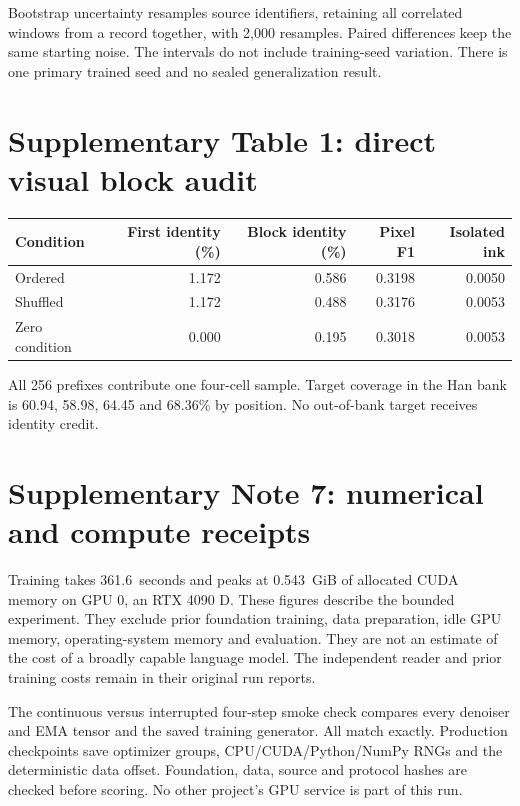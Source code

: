 \documentclass[10pt,a4paper]{article}
\newcommand{\TrainSeconds}{361.6}
\newcommand{\TrainMemory}{0.543}
\begin{document}
Bootstrap uncertainty resamples source identifiers, retaining all correlated
windows from a record together, with 2,000 resamples. Paired differences keep
the same starting noise. The intervals do not include training-seed variation.
There is one primary trained seed and no sealed generalization result.

\section*{Supplementary Table 1: direct visual block audit}
\begin{center}\begin{tabular}{lrrrr}\toprule
Condition & First identity (\%) & Block identity (\%) & Pixel F1 & Isolated ink \\
\midrule
Ordered & 1.172 & 0.586 & 0.3198 & 0.0050 \\
Shuffled & 1.172 & 0.488 & 0.3176 & 0.0053 \\
Zero condition & 0.000 & 0.195 & 0.3018 & 0.0053 \\
\bottomrule\end{tabular}\end{center}
All 256 prefixes contribute one four-cell sample. Target coverage in the Han bank is 60.94, 58.98, 64.45 and 68.36\% by position. No out-of-bank target receives identity credit.


\section*{Supplementary Note 7: numerical and compute receipts}
Training takes \TrainSeconds\ seconds and peaks at \TrainMemory\ GiB of
allocated CUDA memory on GPU 0, an RTX 4090 D. These figures describe the
bounded experiment. They exclude prior foundation training, data preparation,
idle GPU memory, operating-system memory and evaluation. They are not an
estimate of the cost of a broadly capable language model. The independent
reader and prior training costs remain in their original run reports.

The continuous versus interrupted four-step smoke check compares every
denoiser and EMA tensor and the saved training generator. All match exactly.
Production checkpoints save optimizer groups, CPU/CUDA/Python/NumPy RNGs and
the deterministic data offset. Foundation, data, source and protocol hashes
are checked before scoring. No other project's GPU service is part of this run.
\end{document}
